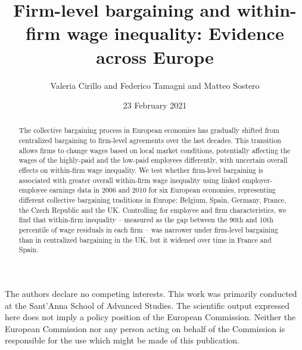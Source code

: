 \documentclass[times]{sagej}
\begin{document}
\title{Firm-level bargaining and within-firm wage inequality: Evidence across Europe}

\date{23 February 2021}

\author{Valeria Cirillo and Federico Tamagni and Matteo Sostero }




\begin{abstract}
The collective bargaining process in European economies has gradually shifted from centralized bargaining to firm-level agreements over the last decades. This transition allows firms to change wages based on local market conditions, potentially affecting the wages of the highly-paid and the low-paid employees differently, with uncertain overall effects on within-firm wage inequality. We test whether firm-level bargaining is associated with greater overall within-firm wage inequality using linked employer-employee earnings data in 2006 and 2010 for six European economies, representing different collective bargaining traditions in Europe: Belgium, Spain, Germany, France, the Czech Republic and the UK. Controlling for employee and firm characteristics, we find that within-firm inequality -- measured as the gap between the 90th and 10th percentile of wage residuals in each firm -- was narrower under firm-level bargaining than in centralized bargaining in the UK, but it widened over time in France and Spain.
\end{abstract}


\maketitle

\begin{dci}
The authors declare no competing interests.
This work was primarily conducted at the Sant'Anna School of Advanced Studies.
The scientific output expressed here does not imply a policy position of the European Commission.
Neither the European Commission nor any person acting on behalf of the Commission is responsible for the use which might be made of this publication.
\end{dci}
\end{document}
